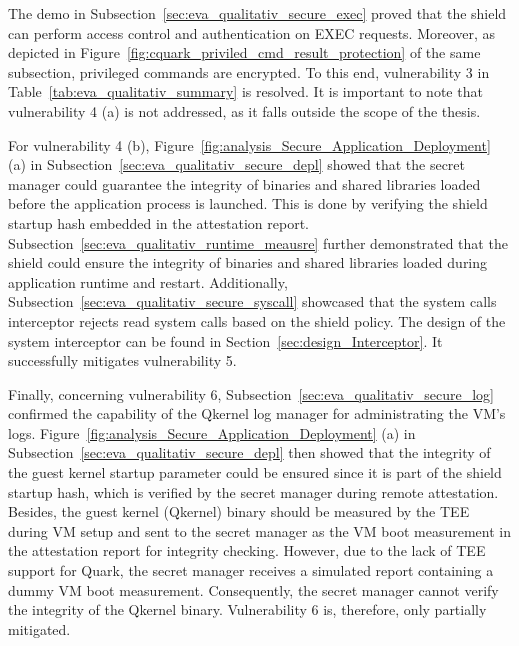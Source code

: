 The demo in Subsection~\ref{sec:eva_qualitativ_secure_exec} proved that the shield can perform access control and authentication on EXEC requests. Moreover, as depicted in Figure~\ref{fig:cquark_priviled_cmd_result_protection} of the same subsection, privileged commands are encrypted. 
To this end, vulnerability 3 in Table~\ref{tab:eva_qualitativ_summary} is resolved. It is important to note that vulnerability 4 (a) is not addressed, as it falls outside the scope of the thesis. 

For vulnerability 4 (b), Figure~\ref{fig:analysis_Secure_Application_Deployment} (a) in Subsection~\ref{sec:eva_qualitativ_secure_depl} showed that the secret manager could guarantee the integrity of binaries and shared libraries loaded before the application process is launched. 
This is done by verifying the shield startup hash embedded in the attestation report. Subsection~\ref{sec:eva_qualitativ_runtime_meausre} further demonstrated that the shield could ensure the integrity of binaries and shared libraries loaded during application runtime and restart. 
Additionally, Subsection~\ref{sec:eva_qualitativ_secure_syscall} showcased that the system calls interceptor rejects read system calls based on the shield policy. The design of the system interceptor can be found in Section~\ref{sec:design_Interceptor}. It successfully mitigates vulnerability 5. 



Finally, concerning vulnerability 6, Subsection~\ref{sec:eva_qualitativ_secure_log} confirmed the capability of the Qkernel log manager for administrating the VM's logs. Figure~\ref{fig:analysis_Secure_Application_Deployment} (a) in Subsection~\ref{sec:eva_qualitativ_secure_depl} then showed 
that the integrity of the guest kernel startup parameter could be ensured since it is part of the shield startup hash, which is verified by the secret manager during remote attestation. Besides, the guest kernel (Qkernel)  binary should be measured by the TEE during VM 
setup and sent to the secret manager as the VM boot measurement in the attestation report for integrity checking. However, due to the lack of TEE support for Quark, the secret manager receives a simulated report containing a dummy VM boot measurement. Consequently, 
the secret manager cannot verify the integrity of the Qkernel binary. Vulnerability 6 is, therefore, only partially mitigated. 


